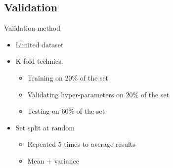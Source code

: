 \documentclass[11pt)]{beamer}
\begin{document}
\subsection{Validation}
\begin{frame}{Validation method}
  \begin{itemize}
  \item Limited dataset
  \item K-fold technics:
	  \begin{itemize}
	    \item Training on $20\%$ of the set
	    \item Validating hyper-parameters on $20\%$ of the set
	    \item Testing on $60\%$ of the set
	  \end{itemize}
  \item Set split at random
	    \begin{itemize}
	    \item Repeated 5 times to average results
	    \item Mean + variance
	  \end{itemize}
  \end{itemize}
\end{frame}
\end{document}
